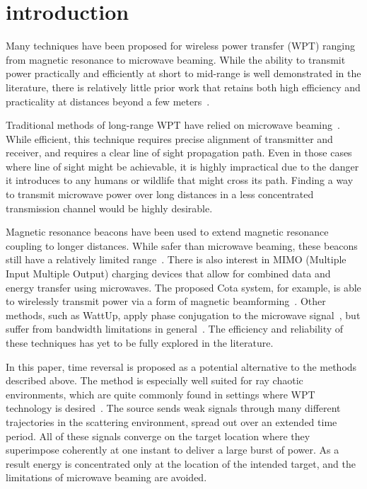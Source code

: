 \section{introduction}
\label{sec:intro}

Many techniques have been proposed for wireless power transfer (WPT)
ranging from magnetic resonance to microwave beaming.
%
While the ability to transmit power practically and efficiently at short to
mid-range is well demonstrated in the literature, there is relatively little
prior work that retains both high efficiency and practicality at distances
beyond a few meters~\cite{wpt-progress}.



Traditional methods of long-range WPT have relied on microwave
beaming~\cite{history-wpt}.
%
While efficient, this technique requires precise alignment of transmitter and
receiver, and requires a clear line of sight propagation path.
%
Even in those cases where line of sight might be achievable, it is highly
impractical due to the danger it introduces to any humans or wildlife that might
cross its path.
%
Finding a way to transmit microwave power over long distances in a less
concentrated transmission channel would be highly desirable.



Magnetic resonance beacons have been used to extend magnetic resonance coupling
to longer distances.
%
While safer than microwave beaming, these beacons still have a relatively
limited range~\cite{wpt-progress}.
%
There is also interest in MIMO (Multiple Input Multiple Output) charging devices
that allow for combined data and energy transfer using microwaves.
%
The proposed Cota system, for example, is able to wirelessly transmit power via
a form of magnetic beamforming~\cite{mimo}.
%
Other methods, such as WattUp, apply phase conjugation to the
microwave signal~\cite{wattup}, but suffer from bandwidth
limitations in general~\cite{prada-mirror,derode-mult}.
%
The efficiency and reliability of these techniques has yet to be fully explored
in the literature.



In this paper, time reversal is proposed as a potential alternative to
the methods described above.
%
The method is especially well suited for ray chaotic environments, which are
quite commonly found in settings where WPT technology is desired~\cite{hemmady}.
%
The source sends weak signals through many different trajectories in the
scattering environment, spread out over an extended time period.
%
All of these signals converge on the target location where they
superimpose coherently at one instant to deliver a large burst of power.
%
As a result energy is concentrated only at the location of the intended target,
and the limitations of microwave beaming are avoided.



